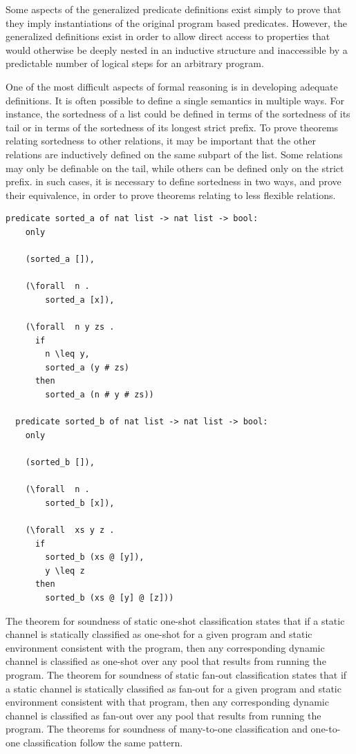 \documentclass[10pt]{article}
\begin{document}
Some aspects of the generalized predicate definitions exist simply to prove that they imply
instantiations of the original program based predicates. However, the generalized
definitions exist in order to allow direct access to properties that would
otherwise be deeply nested
in an inductive structure and inaccessible by a predictable number of
logical steps for an arbitrary
program.

One of the most difficult aspects of formal reasoning is in developing adequate definitions.
It is often possible to define a single semantics in multiple ways.
For instance, the sortedness of a list could be defined in terms of the sortedness of its tail
or in terms of the sortedness of its longest strict prefix. To prove theorems relating
sortedness to other relations, it may be important that the other relations are inductively
defined on the same subpart of the list. Some relations may only be definable on the tail,
while others can be defined only on the strict prefix. in such cases, it is necessary to
define sortedness in two ways, and prove their equivalence, in order to prove theorems relating
to less flexible relations.

\begin{lstlisting}[language=logic, mathescape]
  predicate sorted_a of nat list -> nat list -> bool:
    only

    (sorted_a []),

    (\forall  n .
        sorted_a [x]),

    (\forall  n y zs .
      if 
        n \leq y,
        sorted_a (y # zs)
      then
        sorted_a (n # y # zs))

  predicate sorted_b of nat list -> nat list -> bool:
    only

    (sorted_b []),

    (\forall  n .
        sorted_b [x]),

    (\forall  xs y z .
      if 
        sorted_b (xs @ [y]),
        y \leq z 
      then
        sorted_b (xs @ [y] @ [z]))
  \end{lstlisting}

The theorem for soundness of static one-shot classification states that if a static channel is
statically classified as one-shot for a given program and
static environment consistent with the
program, then any corresponding dynamic channel is classified
as one-shot over any pool that results
from running the program. The theorem for soundness of
static fan-out classification states that if
a static channel is statically classified as fan-out for a given program and static environment
consistent with that program, then any corresponding dynamic channel is classified as fan-out
over any pool that results from running the program.  The theorems for soundness of many-to-one
classification and one-to-one classification follow the same pattern. 
\end{document}
